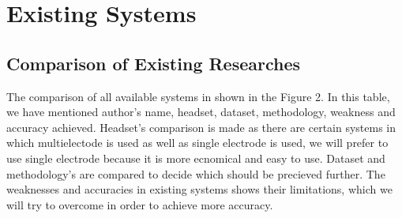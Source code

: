 \documentclass[a4paper, 12pt, oneside]{uet_thesis}
\begin{document}
\newpage
\chapter{Existing Systems}
\section{Comparison of Existing Researches}
The comparison of all available systems in shown in the Figure 2. In this table, we have mentioned author's name, headset, dataset, methodology, weakness and accuracy achieved. Headset's comparison is made as there are certain systems in which multi\-electode is used as well as single electrode is used, we will prefer to use single electrode because it is more ecnomical and easy to use. Dataset and methodology's are compared to decide which should be precieved further. The weaknesses and accuracies in existing systems shows their limitations, which we will try to overcome in order to achieve more accuracy.  
\end{document}
